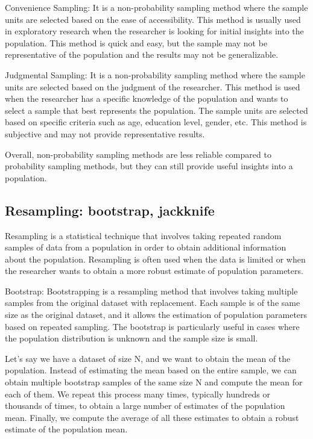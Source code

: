 \documentclass[12pt, a4paper, oneside]{article}
\begin{document}
Convenience Sampling: It is a non-probability sampling method where the sample units are selected based on the ease of accessibility. This method is usually used in exploratory research when the researcher is looking for initial insights into the population. This method is quick and easy, but the sample may not be representative of the population and the results may not be generalizable.

Judgmental Sampling: It is a non-probability sampling method where the sample units are selected based on the judgment of the researcher. This method is used when the researcher has a specific knowledge of the population and wants to select a sample that best represents the population. The sample units are selected based on specific criteria such as age, education level, gender, etc. This method is subjective and may not provide representative results.

Overall, non-probability sampling methods are less reliable compared to probability sampling methods, but they can still provide useful insights into a population.






\subsection{ Resampling: bootstrap, jackknife }
Resampling is a statistical technique that involves taking repeated random samples of data from a population in order to obtain additional information about the population. Resampling is often used when the data is limited or when the researcher wants to obtain a more robust estimate of population parameters.

Bootstrap:
Bootstrapping is a resampling method that involves taking multiple samples from the original dataset with replacement. Each sample is of the same size as the original dataset, and it allows the estimation of population parameters based on repeated sampling. The bootstrap is particularly useful in cases where the population distribution is unknown and the sample size is small.

Let's say we have a dataset of size N, and we want to obtain the mean of the population. Instead of estimating the mean based on the entire sample, we can obtain multiple bootstrap samples of the same size N and compute the mean for each of them. We repeat this process many times, typically hundreds or thousands of times, to obtain a large number of estimates of the population mean. Finally, we compute the average of all these estimates to obtain a robust estimate of the population mean.
\end{document}
